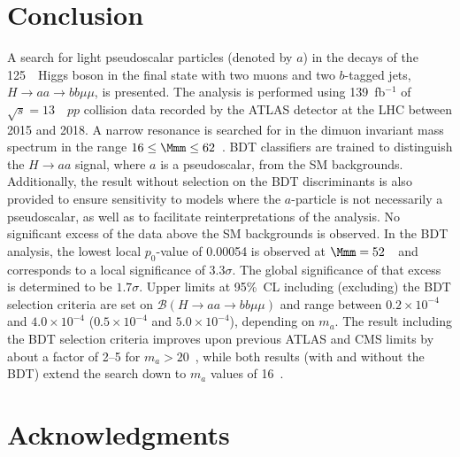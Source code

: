 \documentclass[cernpreprint, backref=false, texlive=2020, UKenglish, dvipsnames, block=none, texmf]{atlasdoc}
\begin{document}
 
 
\FloatBarrier
 
 
\section{Conclusion}
 
A search for light pseudoscalar particles (denoted by $a$) in the decays of the 125~\GeV\ Higgs boson in the final state with two muons and two $b$-tagged jets, $H \rightarrow aa \rightarrow bb\mu\mu$, is presented.
The analysis is performed using 139~fb$^{-1}$ of $\sqrt{s}=13$~\TeV\ $pp$ collision data recorded by the ATLAS detector at the LHC between 2015 and 2018. A narrow resonance is searched for in the dimuon invariant mass spectrum in the range $16 \leq \Mmm \leq 62$~\GeV.
BDT classifiers are trained to distinguish the $H \rightarrow aa$ signal, where $a$ is a pseudoscalar, from the SM backgrounds.
Additionally, the result without selection on the BDT discriminants is also provided to ensure sensitivity to models where the $a$-particle is not necessarily a pseudoscalar, as well as  to facilitate reinterpretations of the analysis.
No significant excess of the data above the SM backgrounds is observed.
In the BDT analysis, the lowest local $p_0$-value of 0.00054 is observed at $\Mmm= 52$~\GeV\ and corresponds to a local significance of $3.3 \sigma$. The global significance of that excess is determined to be $1.7 \sigma$.
Upper limits at 95\%~CL including (excluding) the BDT selection criteria are set on $\mathcal{B}(H \rightarrow aa \rightarrow bb\mu\mu)$ and range between $0.2\times10^{-4}$ and $4.0\times10^{-4}$ ($0.5\times10^{-4}$ and $5.0\times10^{-4}$), depending on $m_a$.
The result including the BDT selection criteria improves upon previous ATLAS and CMS limits by about a factor of 2--5 for $m_a>20$~\GeV, while both results (with and without the BDT) extend the search down to $m_a$ values of 16~\GeV.
 
 
 
 
 
\section*{Acknowledgments}
 
 
\end{document}
